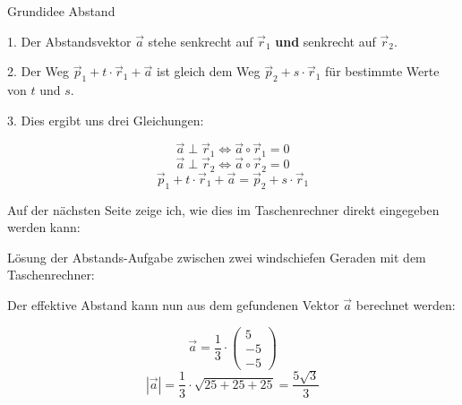 \begin{rezept}{Grundidee Abstand}{}

  1. Der Abstandsvektor $\vec{a}$ stehe senkrecht auf $\vec{r}_1$
  \textbf{und} senkrecht auf $\vec{r}_2$.

  2. Der Weg $\vec{p}_1 + t\cdot{}\vec{r}_1 + \vec{a}$ ist gleich dem
  Weg $\vec{p}_2 +  s\cdot{}\vec{r}_1$ für bestimmte Werte von $t$ und
  $s$.

  3. Dies ergibt uns drei Gleichungen:

  $$\vec{a}\perp\vec{r}_1 \Longleftrightarrow{}  \vec{a}\circ{}\vec{r}_1 = 0$$
  $$\vec{a}\perp\vec{r}_2 \Longleftrightarrow{}  \vec{a}\circ{}\vec{r}_2 = 0$$
  $$\vec{p}_1 + t\cdot{}\vec{r}_1 + \vec{a} = \vec{p}_2 + s\cdot{}\vec{r}_1$$
  
\end{rezept}

Auf der nächsten Seite zeige ich, wie dies im Taschenrechner direkt
eingegeben werden kann:
\newpage

Lösung der Abstands-Aufgabe zwischen zwei windschiefen Geraden mit dem
Taschenrechner:


Der effektive Abstand kann nun aus dem gefundenen Vektor $\vec{a}$
berechnet werden:

$$\vec{a} = \frac13\cdot{}\begin{pmatrix}5\\-5\\-5\end{pmatrix}$$
$$|\vec{a}| = \frac13\cdot{}\sqrt{25+25+25} = \frac{5\sqrt{3}}{3}$$
\newpage

